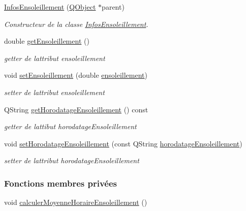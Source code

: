 \begin{DoxyCompactItemize}
\item 
\hyperlink{class_infos_ensoleillement_a5037621d40a4e62f01182f6742388fcd}{Infos\+Ensoleillement} (\hyperlink{class_q_object}{Q\+Object} $\ast$parent)
\begin{DoxyCompactList}\small\item\em Constructeur de la classe \hyperlink{class_infos_ensoleillement}{Infos\+Ensoleillement}. \end{DoxyCompactList}\item 
double \hyperlink{class_infos_ensoleillement_a388dd7b2ae97839a779ca1384ca8e6e2}{get\+Ensoleillement} ()
\begin{DoxyCompactList}\small\item\em getter de l\textquotesingle{}attribut ensoleillement \end{DoxyCompactList}\item 
void \hyperlink{class_infos_ensoleillement_a27c6d3d6e063e2f09fbe23a04cd89dfc}{set\+Ensoleillement} (double \hyperlink{class_infos_ensoleillement_a5f3ad64743e3beeb4e64c4555ec6155c}{ensoleillement})
\begin{DoxyCompactList}\small\item\em setter de l\textquotesingle{}attribut ensoleillement \end{DoxyCompactList}\item 
Q\+String \hyperlink{class_infos_ensoleillement_a0bd39540c8b4a242ea378c91bbc58b89}{get\+Horodatage\+Ensoleillement} () const
\begin{DoxyCompactList}\small\item\em getter de l\textquotesingle{}attibut horodatage\+Ensoleillement \end{DoxyCompactList}\item 
void \hyperlink{class_infos_ensoleillement_a35cd0359b8bcf5bd572cbef2195fa8d1}{set\+Horodatage\+Ensoleillement} (const Q\+String \hyperlink{class_infos_ensoleillement_aa2014f9d13e69e9807543737240dbfd3}{horodatage\+Ensoleillement})
\begin{DoxyCompactList}\small\item\em setter de l\textquotesingle{}attribut horodatage\+Ensoleillement \end{DoxyCompactList}\end{DoxyCompactItemize}
\subsubsection*{Fonctions membres privées}
\begin{DoxyCompactItemize}
\item 
void \hyperlink{class_infos_ensoleillement_a43d0967a59887bf70071296fef0660d3}{calculer\+Moyenne\+Horaire\+Ensoleillement} ()
\end{DoxyCompactItemize}
